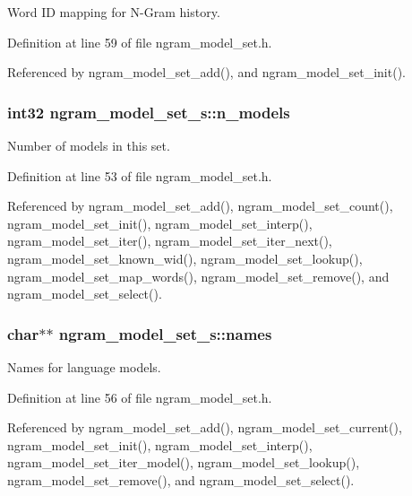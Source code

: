 Word I\-D mapping for N-\/\-Gram history. 



Definition at line 59 of file ngram\-\_\-model\-\_\-set.\-h.



Referenced by ngram\-\_\-model\-\_\-set\-\_\-add(), and ngram\-\_\-model\-\_\-set\-\_\-init().

\subsubsection[{n\-\_\-models}]{\setlength{\rightskip}{0pt plus 5cm}int32 ngram\-\_\-model\-\_\-set\-\_\-s\-::n\-\_\-models}\label{structngram__model__set__s_a6c28858d5631a9c9dbc7b2c9583f5c5a}


Number of models in this set. 



Definition at line 53 of file ngram\-\_\-model\-\_\-set.\-h.



Referenced by ngram\-\_\-model\-\_\-set\-\_\-add(), ngram\-\_\-model\-\_\-set\-\_\-count(), ngram\-\_\-model\-\_\-set\-\_\-init(), ngram\-\_\-model\-\_\-set\-\_\-interp(), ngram\-\_\-model\-\_\-set\-\_\-iter(), ngram\-\_\-model\-\_\-set\-\_\-iter\-\_\-next(), ngram\-\_\-model\-\_\-set\-\_\-known\-\_\-wid(), ngram\-\_\-model\-\_\-set\-\_\-lookup(), ngram\-\_\-model\-\_\-set\-\_\-map\-\_\-words(), ngram\-\_\-model\-\_\-set\-\_\-remove(), and ngram\-\_\-model\-\_\-set\-\_\-select().

\subsubsection[{names}]{\setlength{\rightskip}{0pt plus 5cm}char$\ast$$\ast$ ngram\-\_\-model\-\_\-set\-\_\-s\-::names}\label{structngram__model__set__s_aff5e13c45decde4c5bf30d8aa2b1c7d9}


Names for language models. 



Definition at line 56 of file ngram\-\_\-model\-\_\-set.\-h.



Referenced by ngram\-\_\-model\-\_\-set\-\_\-add(), ngram\-\_\-model\-\_\-set\-\_\-current(), ngram\-\_\-model\-\_\-set\-\_\-init(), ngram\-\_\-model\-\_\-set\-\_\-interp(), ngram\-\_\-model\-\_\-set\-\_\-iter\-\_\-model(), ngram\-\_\-model\-\_\-set\-\_\-lookup(), ngram\-\_\-model\-\_\-set\-\_\-remove(), and ngram\-\_\-model\-\_\-set\-\_\-select().

